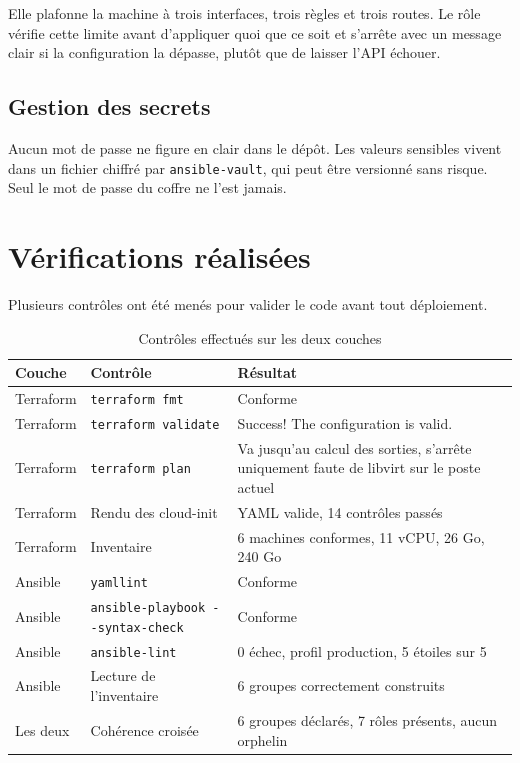 \documentclass[11pt,a4paper]{article}
\newcommand{\ttb}[1]{\texttt{\small #1}}
\begin{document}
\begin{alertbox}
Elle plafonne la machine à trois interfaces, trois règles et trois routes. Le
rôle vérifie cette limite avant d'appliquer quoi que ce soit et s'arrête avec un
message clair si la configuration la dépasse, plutôt que de laisser l'API
échouer.
\end{alertbox}

\subsection{Gestion des secrets}

Aucun mot de passe ne figure en clair dans le dépôt. Les valeurs sensibles
vivent dans un fichier chiffré par \ttb{ansible-vault}, qui peut être versionné
sans risque. Seul le mot de passe du coffre ne l'est jamais.

\section{Vérifications réalisées}

Plusieurs contrôles ont été menés pour valider le code avant tout déploiement.

\begin{table}[H]
\centering
\caption{Contrôles effectués sur les deux couches}
\begin{tabularx}{\textwidth}{L{3.0cm} L{4.6cm} Y}
\toprule
{}\textbf{Couche} & \textbf{Contrôle} & \textbf{Résultat} \\
\midrule
Terraform & \ttb{terraform fmt} & Conforme \\
Terraform & \ttb{terraform validate} & Success! The configuration is valid. \\
Terraform & \ttb{terraform plan} & Va jusqu'au calcul des sorties, s'arrête uniquement faute de libvirt sur le poste actuel \\
Terraform & Rendu des cloud-init & YAML valide, 14 contrôles passés \\
Terraform & Inventaire & 6 machines conformes, 11 vCPU, 26 Go, 240 Go \\
\midrule
Ansible & \ttb{yamllint} & Conforme \\
Ansible & \ttb{ansible-playbook -{}-syntax-check} & Conforme \\
Ansible & \ttb{ansible-lint} & 0 échec, profil production, 5 étoiles sur 5 \\
Ansible & Lecture de l'inventaire & 6 groupes correctement construits \\
\midrule
Les deux & Cohérence croisée & 6 groupes déclarés, 7 rôles présents, aucun orphelin \\
\bottomrule
\end{tabularx}
\end{table}
\end{document}
